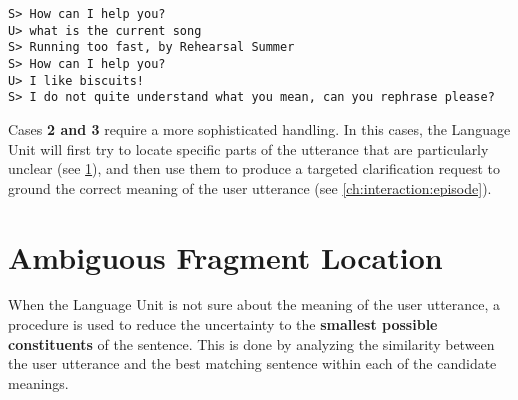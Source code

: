 \texttt{S> How can I help you? \\
U> what is the current song \\
S> Running too fast, by Rehearsal Summer \\
S> How can I help you? \\
U> I like biscuits! \\
S> I do not quite understand what you mean, can you rephrase please?}

Cases \textbf{2 and 3} require a more sophisticated handling. In this cases, the Language Unit will first try to locate specific parts of the utterance that are particularly unclear (see \ref{ch:interaction:afl}), and then use them to produce a targeted clarification request to ground the correct meaning of the user utterance (see \ref{ch:interaction:episode}).


\section{Ambiguous Fragment Location} \label{ch:interaction:afl}
When the Language Unit is not sure about the meaning of the user utterance, a procedure is used to reduce the uncertainty to the \textbf{smallest possible constituents} of the sentence. This is done by analyzing the similarity between the user utterance and the best matching sentence within each of the candidate meanings.

